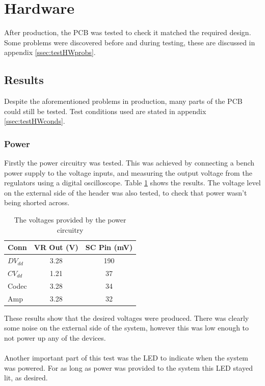 \section{Hardware}

After production, the PCB was tested to check it matched the required design.
Some problems were discovered before and during testing, these are discussed in appendix \ref{ssec:testHWprobs}.

\subsection{Results}
Despite the aforementioned problems in production, many parts of the PCB could still be tested.
Test conditions used are stated in appendix \ref{ssec:testHWconds}. 

\subsubsection{Power}
Firstly the power circuitry was tested.
This was achieved by connecting a bench power supply to the voltage inputs, and measuring the output voltage from the regulators using a digital oscilloscope.
Table \ref{tab:powisotest} shows the results.
The voltage level on the external side of the header was also tested, to check that power wasn't being shorted across.

\begin{table}[H]
	\centering
	\begin{tabular}[c]{| l | c | c |}
		\hline
		Conn		& VR Out (V)	& SC Pin (mV)	\\
		\hline
		$DV_{dd}$	& 3.28		& 190		\\
		$CV_{dd}$	& 1.21		& 37		\\
		Codec		& 3.28		& 34		\\
		Amp		& 3.28		& 32		\\
		\hline
	\end{tabular}
	\caption{The voltages provided by the power circuitry}
	\label{tab:powisotest}
\end{table}

\noindent These results show that the desired voltages were produced.
There was clearly some noise on the external side of the system, however this was low enough to not power up any of the devices.
\\
\\
Another important part of this test was the LED to indicate when the system was powered.
For as long as power was provided to the system this LED stayed lit, as desired.

